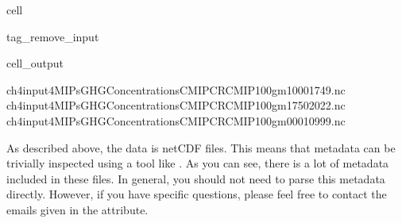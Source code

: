 \documentclass[letterpaper,10pt,english]{jupyterBook}
\begin{document}
\begin{sphinxuseclass}{cell}
\begin{sphinxuseclass}{tag_remove_input}\begin{sphinxVerbatimOutput}

\begin{sphinxuseclass}{cell_output}
\begin{sphinxVerbatim}[commandchars=\\\{\}]
\PYGZhy{} ch4\PYGZus{}input4MIPs\PYGZus{}GHGConcentrations\PYGZus{}CMIP\PYGZus{}CR\PYGZhy{}CMIP\PYGZhy{}1\PYGZhy{}0\PYGZhy{}0\PYGZus{}gm\PYGZus{}1000\PYGZhy{}1749.nc
\PYGZhy{} ch4\PYGZus{}input4MIPs\PYGZus{}GHGConcentrations\PYGZus{}CMIP\PYGZus{}CR\PYGZhy{}CMIP\PYGZhy{}1\PYGZhy{}0\PYGZhy{}0\PYGZus{}gm\PYGZus{}1750\PYGZhy{}2022.nc
\PYGZhy{} ch4\PYGZus{}input4MIPs\PYGZus{}GHGConcentrations\PYGZus{}CMIP\PYGZus{}CR\PYGZhy{}CMIP\PYGZhy{}1\PYGZhy{}0\PYGZhy{}0\PYGZus{}gm\PYGZus{}0001\PYGZhy{}0999.nc
\end{sphinxVerbatim}

\end{sphinxuseclass}\end{sphinxVerbatimOutput}

\end{sphinxuseclass}
\end{sphinxuseclass}
\sphinxAtStartPar
As described above, the data is netCDF files.
This means that metadata can be trivially inspected
using a tool like .
As you can see, there is a lot of metadata included in these files.
In general, you should not need to parse this metadata directly.
However, if you have specific questions,
please feel free to contact the emails given in the  attribute.
\end{document}
